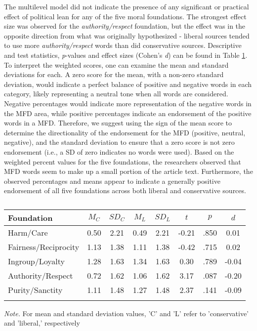 \documentclass[english,,man]{apa6}
\begin{document}
The multilevel model did not indicate the presence of any significant or practical effect of political lean for any of the five moral foundations. The strongest effect size was observed for the \emph{authority/respect} foundation, but the effect was in the opposite direction from what was originally hypothesized - liberal sources tended to use more \emph{authority/respect} words than did conservative sources. Descriptive and test statistics, \emph{p}-values and effect sizes (Cohen's \emph{d}) can be found in Table \ref{tab:exp1-table}. To interpret the weighted scores, one can examine the mean and standard deviations for each. A zero score for the mean, with a non-zero standard deviation, would indicate a perfect balance of positive and negative words in each category, likely representing a neutral tone when all words are considered. Negative percentages would indicate more representation of the negative words in the MFD area, while positive percentages indicate an endorsement of the positive words in a MFD. Therefore, we suggest using the sign of the mean score to determine the directionality of the endorsement for the MFD (positive, neutral, negative), and the standard deviation to ensure that a zero score is not zero endorsement (i.e., a SD of zero indicates no words were used). Based on the weighted percent values for the five foundations, the researchers observed that MFD words seem to make up a small portion of the article text. Furthermore, the observed percentages and means appear to indicate a generally positive endorsement of all five foundations across both liberal and conservative sources.

\begin{table}[tbp]
\begin{center}
\begin{threeparttable}
\caption{\label{tab:exp1-table}}
\begin{tabular}{lccccccc}
\toprule
Foundation & $M_C$ & $SD_C$ & $M_L$ & $SD_L$ & $t$ & $p$ & $d$\\
\midrule
Harm/Care & 0.50 & 2.21 & 0.49 & 2.21 & -0.21 & .850 & 0.01\\
Fairness/Reciprocity & 1.13 & 1.38 & 1.11 & 1.38 & -0.42 & .715 & 0.02\\
Ingroup/Loyalty & 1.28 & 1.63 & 1.34 & 1.63 & 0.30 & .789 & -0.04\\
Authority/Respect & 0.72 & 1.62 & 1.06 & 1.62 & 3.17 & .087 & -0.20\\
Purity/Sanctity & 1.11 & 1.48 & 1.27 & 1.48 & 2.37 & .141 & -0.09\\
\bottomrule
\addlinespace
\end{tabular}
\begin{tablenotes}[para]
\normalsize{\textit{Note.} For mean and standard deviation values, 'C' and 'L' refer to 'conservative' and 'liberal,' respectively}
\end{tablenotes}
\end{threeparttable}
\end{center}
\end{table}
\end{document}
